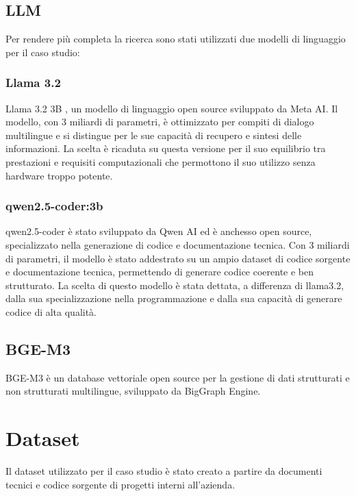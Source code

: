 \documentclass[12pt,a4paper,openright,twoside]{book}
\begin{document}
\subsection{LLM}
Per rendere più completa la ricerca sono stati utilizzati due modelli di linguaggio per il caso studio:
\subsubsection{Llama 3.2}
Llama 3.2 3B \cite{llama3-2}, un modello di linguaggio open source sviluppato da Meta AI.
Il modello, con 3 miliardi di parametri, è ottimizzato per compiti di dialogo multilingue e si distingue per le sue capacità di recupero e sintesi delle informazioni.
La scelta è ricaduta su questa versione per il suo equilibrio tra prestazioni e requisiti computazionali che permottono il suo utilizzo senza hardware troppo potente.

\subsubsection{qwen2.5-coder:3b}
qwen2.5-coder \cite{qwen-coder} è stato sviluppato da Qwen AI ed è anchesso open source, specializzato nella generazione di codice e documentazione tecnica.
Con 3 miliardi di parametri, il modello è stato addestrato su un ampio dataset di codice sorgente e documentazione tecnica, permettendo di generare codice coerente e ben strutturato. 
La scelta di questo modello è stata dettata, a differenza di llama3.2, dalla sua specializzazione nella programmazione e dalla sua capacità di generare codice di alta qualità.

\subsection{BGE-M3}
BGE-M3 \cite{bge-m3} è un database vettoriale open source per la gestione di dati strutturati e non strutturati multilingue, sviluppato da BigGraph Engine.

\section{Dataset}
Il dataset utilizzato per il caso studio è stato creato a partire da documenti tecnici e codice sorgente di progetti interni all'azienda.
\end{document}
